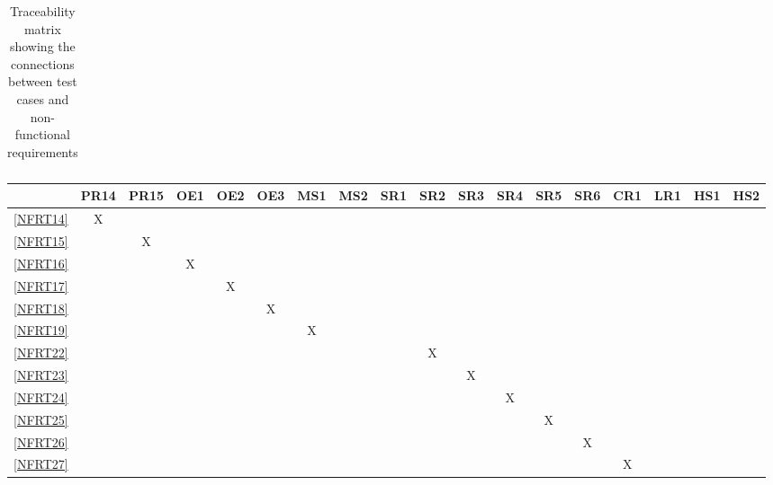 \documentclass[12pt, titlepage]{article}
\begin{document}
\begin{landscape}
\begin{table}[h!]
\begin{tabular}{|c|c|c|c|c|c|c|c|c|c|c|c|c|c|c|c|c|}
    \end{tabular}
    \caption{Traceability matrix showing the connections between test cases
      and non-functional requirements}
    \label{tab:nfrt1}
  \end{table}
  \begin{table}[h!]
    \centering
    \begin{tabular}{|c|c|c|c|c|c|c|c|c|c|c|c|c|c|c|c|c|c|} \hline
                & PR14 & PR15 & OE1 & OE2 & OE3 & MS1 & MS2 & SR1 & SR2 & SR3 & SR4 & SR5 & SR6 & CR1 & LR1 & HS1 & HS2 \\ \hline
      \ref{NFRT14} & X    &      &     &     &     &     &     &     &     &     &     &     &     &     &     &     &     \\ \hline
      \ref{NFRT15} &      & X    &     &     &     &     &     &     &     &     &     &     &     &     &     &     &     \\ \hline
      \ref{NFRT16} &      &      & X   &     &     &     &     &     &     &     &     &     &     &     &     &     &     \\ \hline
      \ref{NFRT17} &      &      &     & X   &     &     &     &     &     &     &     &     &     &     &     &     &     \\ \hline
      \ref{NFRT18} &      &      &     &     & X   &     &     &     &     &     &     &     &     &     &     &     &     \\ \hline
      \ref{NFRT19} &      &      &     &     &     & X   &     &     &     &     &     &     &     &     &     &     &     \\ \hline
      \ref{NFRT22} &      &      &     &     &     &     &     &     & X   &     &     &     &     &     &     &     &     \\ \hline
      \ref{NFRT23} &      &      &     &     &     &     &     &     &     & X   &     &     &     &     &     &     &     \\ \hline
      \ref{NFRT24} &      &      &     &     &     &     &     &     &     &     & X   &     &     &     &     &     &     \\ \hline
      \ref{NFRT25} &      &      &     &     &     &     &     &     &     &     &     & X   &     &     &     &     &     \\ \hline
      \ref{NFRT26} &      &      &     &     &     &     &     &     &     &     &     &     & X   &     &     &     &     \\ \hline
      \ref{NFRT27} &      &      &     &     &     &     &     &     &     &     &     &     &     & X   &     &     &     \\ \hline

\end{tabular}
\end{table}
\end{landscape}
\end{document}
